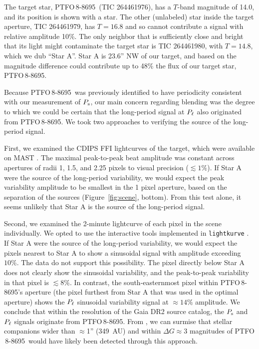 \documentclass[12pt,twocolumn,tighten]{aastex62}
\newcommand{\ptfo}{PTFO$\,$8-8695}
\begin{document}
The target star, \ptfo\ (TIC 264461976), has a $T$-band magnitude
of 14.0, and its position is shown with a star.  The other (unlabeled)
star inside the target aperture, TIC 264461979, has $T=16.8$ and so
cannot contribute a signal with relative amplitude 10\%.  The only
neighbor that is sufficiently close and bright that its light might
contaminate the target star is TIC 264461980, with $T=14.8$, which we
dub ``Star A''.  Star A is 23.6'' NW of our target, and based on
the magnitude difference could contribute up to 48\% the flux of our
target star, \ptfo.  

Because \ptfo\ was previously identified to have periodicity
consistent with our measurement of $P_{\rm s}$, our main concern
regarding blending was the degree to which we could be certain that the
long-period signal at $P_{\rm \ell}$ also originated from \ptfo.
We took two approaches to verifying the source of the
long-period signal.

First, we examined the CDIPS FFI lightcurves of the
target, which were available on MAST \citep{bouma_cluster_2019}.  The
maximal peak-to-peak beat amplitude was constant
across apertures of radii 1, 1.5, and 2.25 pixels to visual precision ($\lesssim 1\%$).
If Star A were the
source of the long-period variability, we would expect the peak
variability amplitude to be smallest in the 1 pixel aperture, based on
the separation of the sources (Figure~\ref{fig:scene}, bottom).  From
this test alone, it seems unlikely that Star A is the source of the
long-period signal.

Second, we examined the 2-minute lightcurve of each pixel in the scene
individually.  We opted to use the interactive tools implemented in
\texttt{lightkurve} \citep{lightkurve_2018}.  If Star A were the
source of the long-period variability, we would expect the pixels
nearest to Star A to show a sinusoidal signal with amplitude exceeding
$10\%$.  The data do not support this possibility.  The pixel
directly below Star A does not clearly show the sinusoidal
variability, and the peak-to-peak variability in that pixel is
$\lesssim 8\%$.  In contrast, the south-easternmost pixel within
\ptfo's aperture (the pixel furthest from Star A that was used in the
optimal aperture) shows the $P_{\rm \ell}$ sinusoidal variability
signal at $\approx 14\%$ amplitude.
We conclude that
within the resolution of the Gaia DR2 source catalog,
the $P_{\rm s}$ and $P_{\rm \ell}$ signals originate from \ptfo.
From \citet{ziegler_measuring_2018}, we can surmise that
stellar companions
wider than $\approx$1'' (349~AU) and within
$\Delta G \approx 3$ magnitudes of \ptfo\ would have likely been
detected through this approach. 
\end{document}
